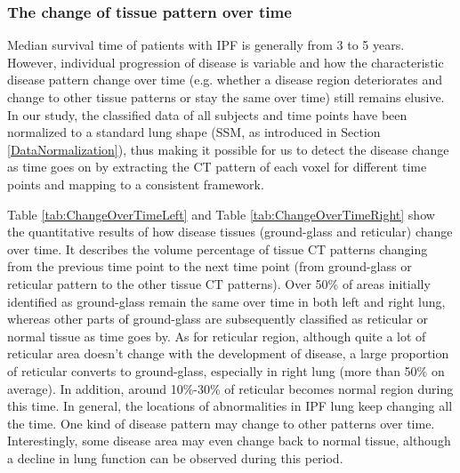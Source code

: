 \subsubsection{The change of tissue pattern over time}
Median survival time of patients with IPF is generally from 3 to 5 years. However, individual progression of disease is variable and how the characteristic disease pattern change over time (e.g. whether a disease region deteriorates and change to other tissue patterns or stay the same over time) still remains elusive. In our study, the classified data of all subjects and time points have been normalized to a standard lung shape (SSM, as introduced in Section \ref{DataNormalization}), thus making it possible for us to detect the disease change as time goes on by extracting the CT pattern of each voxel for different time points and mapping to a consistent framework.

Table \ref{tab:ChangeOverTimeLeft} and Table \ref{tab:ChangeOverTimeRight} show the quantitative results of how disease tissues (ground-glass and reticular) change over time. It describes the volume percentage of tissue CT patterns changing from the previous time point to the next time point (from ground-glass or reticular pattern to the other tissue CT patterns). Over 50\% of areas initially identified as ground-glass remain the same over time in both left and right lung, whereas other parts of ground-glass are subsequently classified as reticular or normal tissue as time goes by. As for reticular region, although quite a lot of reticular area doesn't change with the development of disease, a large proportion of reticular converts to ground-glass, especially in right lung (more than 50\% on average). In addition, around 10\%-30\% of reticular becomes normal region during this time. In general, the locations of abnormalities in IPF lung keep changing all the time. One kind of disease pattern may change to other patterns over time. Interestingly, some disease area may even change back to normal tissue, although a decline in lung function can be observed during this period.

